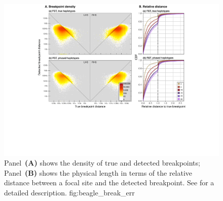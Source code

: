 

\begin{figure}[!htbp]
\includegraphics[width=\textwidth]{./img/ch4/break_beagle_err}
{Panel~\textbf{(A)} shows the density of true and detected breakpoints; Panel~\textbf{(B)} shows the physical length in terms of the relative distance between a focal site and the detected breakpoint.
See  for a detailed description.}
{fig:beagle_break_err}
\end{figure}
